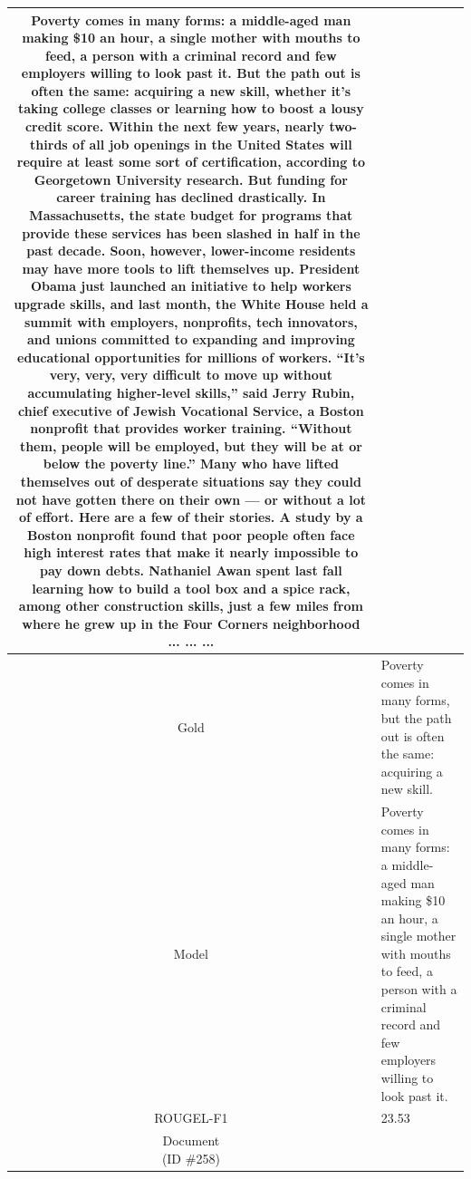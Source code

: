 \begin{table}[bth!]
\begin{tabular}{c|p{}}
Poverty comes in many forms: a middle-aged man making \$10 an hour, a single mother with mouths to feed, a person with a criminal record and few employers willing to look past it. But the path out is often the same: acquiring a new skill, whether it’s taking college classes or learning how to boost a lousy credit score. Within the next few years, nearly two-thirds of all job openings in the United States will require at least some sort of certification, according to Georgetown University research. But funding for career training has declined drastically. In Massachusetts, the state budget for programs that provide these services has been slashed in half in the past decade. Soon, however, lower-income residents may have more tools to lift themselves up. President Obama just launched an initiative to help workers upgrade skills, and last month, the White House held a summit with employers, nonprofits, tech innovators, and unions committed to expanding and improving educational opportunities for millions of workers. “It’s very, very, very difficult to move up without accumulating higher-level skills,” said Jerry Rubin, chief executive of Jewish Vocational Service, a Boston nonprofit that provides worker training. “Without them, people will be employed, but they will be at or below the poverty line.” Many who have lifted themselves out of desperate situations say they could not have gotten there on their own — or without a lot of effort. Here are a few of their stories. A study by a Boston nonprofit found that poor people often face high interest rates that make it nearly impossible to pay down debts. Nathaniel Awan spent last fall learning how to build a tool box and a spice rack, among other construction skills, just a few miles from where he grew up in the Four Corners neighborhood ... ... ... 
\\ \hline
Gold & 
Poverty comes in many forms, but the path out is often the same: acquiring a new skill.
\\ \hline
Model & 
Poverty comes in many forms: a middle-aged man making \$10 an hour, a single mother with mouths to feed, a person with a criminal record and few employers willing to look past it.
\\ \hline
ROUGEL-F1 & 
23.53
\\ \hline
\makecell{Document\\(ID \#258)} & 

\end{tabular}
\end{table}
